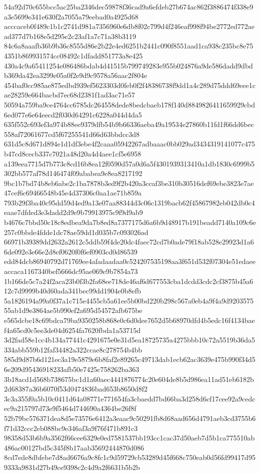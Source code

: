 \documentclass[11pt,a4paper]{article}
\begin{document}
{54a92d70c655bcc5ac25ba2346dec59878f36cad9a6efdeb27b674ac862f3886474f338e9a3e5699e341e630f2a7055a79eebad0a4925d68
acccaceb0f489c1b1c2741d981a7356960e6db8f02c799d4f246eaf998f94be2772ed772aead377d7b168e5d295e2c23af1a7c71a38b3119
84c6a8aaafb36b9b36c8555d86e2b22e4ed6251b2441c090f8551aad1ca938c235bc8e754351b869931574cc08492c1dfadd851773a8e425
430a4c9a65411254e086486bdab4d41515b799749283e955b024876a9de586dadd9dbdb369da42ea3299e05a0f2e9d9c9578a56aac2f804e
454baf0cc985ae875edbd939ef5623303d0feb0f2f48386738f9dd1a4c289d75ddd69eee1cae28259e664bacbd7ec68d2381f1ad3ac71e57
50594a759ba9ce4764cc6785dc264558dede8bedcbaeb178f140d8849826411659929cbd6ed077e6e64eecd2f030d64291c6228a044d4da5
635f552c693ef3a974b88ee9379dfb54b9b66336aeba49a19534e27860b11fd1f66dd6bec558af72061677cd5f67255541d66d63bbdcc3d8
631d5c8d671d894e1d1df3ebe4f2caaa05942267adbaaac0bb029ad3434319141077c475b47cd8cecb337c7021a48d20a4d4aee1cf5e6958
a139eea7715d7b773c8cd16b8ea12f0590d57a0d6a5f4301939313410a1db1830c6999b5302bb577af78d146474f09ababea9e8ea8217192
9bc1b7bd74b8eb6abe2c1ba7878b3ed9f2b420a3ccaf3be310b30516def69ebe3823e7ae47cef6c69466548b45e4d37306c0aa1ae71b859a
793b29f3ba40c95dd59d4ed9a13e07aa88344d3c06c1319bacb62f45867982eb042db0c4eaae7dfded3e3dadd2d9e9b79913975c9f9d9ab9
b4676c7bbd50c18c8edbea9da7b8ed8a7377175d6a6b9d48917b191beadd7140a109c6e257c0bbde4fdde1dc78ae59dd1d035b7c093026ad
66971b39389dd2632a2612c5ddb59f4de20dc4faec72cd7b0ade79f18ab528e29923d1a66de092e3e66e2d8ef0620f0f6ef0903cd0d86539
edd84dcb86940792d71769ee4afadaadaa0c524207535198aa3f651d532f07304e51edaeeaccaca1167340bef5666dc95ae069e9b7854a73
1b166de5c7a24f2aca23b0f3b2fa68ee718de46af6d677553cba1dcdd3cdc2cf3875b45a612c7d9999b40d60ada341bec99dd1904e0b8efb
5a1826194a99a0f37a1c715e4455cb5a61ee5b00bd220b298c567a0eb4a9f4a9d920357555ab1d9e3864ae5b990ef2a695d54572afb675be
e565dcbe18c69bdca79ba9350258b868e0c6d0dee7652d5b68970dfd4b5edc16f4134baef4a65cd0c5ee3de04d6254fa7620fbda1a53715d
3d2fad58e1cc4b134a77441c4291675e0e31d5ea18725735a4275bbb10c72a5519b36da5334abb559b12faf34482a322ccae8c278754b4bb
585d9d87b6d121ec3a19e5879e6b8faf2e89265c49713dab1ecb62ac3639e475b990f34d56e209d95436918233afb50e7425c758262ba363
3b18acd1d568b738675bc1d1a60aec4441876774c20e604de8b5d986ea11ad51eb6182b2d68387a36b6070f53d0474836bad653b8650d8f2
3c3a355f0a5b10c0411d64a08771e771654fa3cbaedd7bd66ba3d258d6cf17cee92a9cedcec9a215797d73e9f5464d744690a4364be26f8f
52b79bc576371dea8d5e73576e6412a3eaac9c50291fb8d68aad656d4791aeb3cd3755b6f71d32ccc2eb088bc9e346af3a9f76f471b891c3
98358d53b6b9a3562f66cee6329e0ed7581537bb193cc1cac37d50aeb7d5b1ca775510ab486ac00127bd5c345f8b17aab35692444870d086
8cd7ede8dbfebe7d8ad6676a9c8fc1c9d59729cb53289d45f668c750eab0d56fd99417d959333a9831d27b49ce9398c2c4d9a2f6631b5b2b
}
\end{document}
